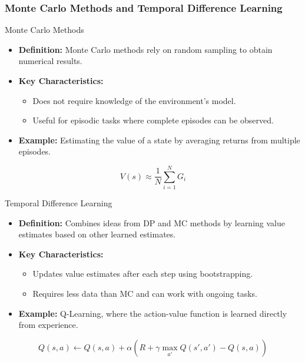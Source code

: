 \documentclass[aspectratio=169]{beamer}
\begin{document}
\begin{frame}[fragile]
    \frametitle{Monte Carlo Methods and Temporal Difference Learning}
    \begin{block}{Monte Carlo Methods}
        \begin{itemize}
            \item \textbf{Definition:} Monte Carlo methods rely on random sampling to obtain numerical results.
            \item \textbf{Key Characteristics:}
                \begin{itemize}
                    \item Does not require knowledge of the environment's model.
                    \item Useful for episodic tasks where complete episodes can be observed.
                \end{itemize}
            \item \textbf{Example:} Estimating the value of a state by averaging returns from multiple episodes.
        \end{itemize}
        \begin{equation}
            V(s) \approx \frac{1}{N} \sum_{i=1}^N G_i
        \end{equation}
    \end{block}
    \begin{block}{Temporal Difference Learning}
        \begin{itemize}
            \item \textbf{Definition:} Combines ideas from DP and MC methods by learning value estimates based on other learned estimates.
            \item \textbf{Key Characteristics:}
                \begin{itemize}
                    \item Updates value estimates after each step using bootstrapping.
                    \item Requires less data than MC and can work with ongoing tasks.
                \end{itemize}
            \item \textbf{Example:} Q-Learning, where the action-value function is learned directly from experience.
        \end{itemize}
        \begin{equation}
            Q(s, a) \leftarrow Q(s, a) + \alpha \left( R + \gamma \max_{a'} Q(s', a') - Q(s, a) \right)
        \end{equation}
    \end{block}
\end{frame}
\end{document}
